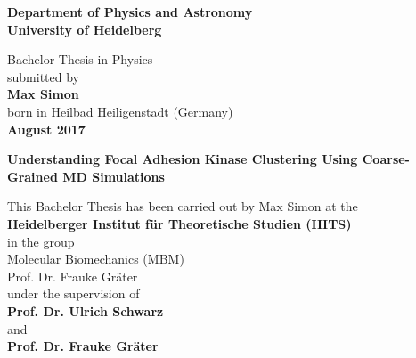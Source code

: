 \begin{titlepage}
\begin{center}
\thispagestyle{empty}
\Large\textbf{Department of Physics and Astronomy\\
University of Heidelberg}

\vspace{15cm}

\normalsize
Bachelor Thesis in Physics\\
submitted by\\
\vspace{0.5cm}
\Large\textbf{Max Simon}\\
\normalsize
\vspace{0.5cm}
born in Heilbad Heiligenstadt (Germany)\\
\vspace{0.5cm}
\Large\textbf{August 2017}
\normalsize

\newpage
\leavevmode\thispagestyle{empty}\newpage

\thispagestyle{empty}

\LARGE\textbf{Understanding Focal Adhesion Kinase Clustering Using Coarse-Grained MD Simulations}

\vspace{15cm}

\normalsize
This Bachelor Thesis has been carried out by Max Simon at the\\
\vspace{0.6cm}
\textbf{Heidelberger Institut für Theoretische Studien (HITS)}\\
in the group\\
Molecular Biomechanics (MBM)\\
Prof. Dr. Frauke Gräter\\
\vspace{0.6cm}
under the supervision of\\
\vspace{0.6cm}
\textbf{Prof. Dr. Ulrich Schwarz}\\
and\\
\textbf{Prof. Dr. Frauke Gräter}
\vfill
\end{center}

\end{titlepage}
\newpage
\leavevmode\thispagestyle{empty}\newpage
